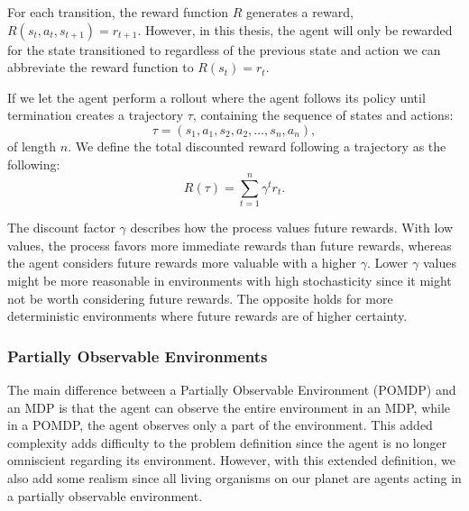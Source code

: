 \documentclass[12pt,A4]{report}
\theoremstyle{definition}
\begin{document}
For each transition, the reward function $R$  generates a reward, $R(s_t, a_t, s_{t+1}) = r_{t+1}$. However, in this thesis, the agent will only be rewarded for the state transitioned to regardless of the previous state and action we can abbreviate the reward function to $R(s_t) = r_t$.


If we let the agent perform a rollout where the agent follows its policy until termination creates a trajectory $\tau$, containing the sequence of states and actions:
\[ \tau = (s_1, a_1, s_2, a_2, \dots , s_n, a_n),\]
of length $n$. We define the total discounted reward following a trajectory as the following:
\[ R(\tau) = \sum_{t=1}^n \gamma^t r_t.\]

The discount factor $\gamma$ describes how the process values future rewards. With low values, the process favors more immediate rewards than future rewards, whereas the agent considers future rewards more valuable with a higher $\gamma$. Lower $\gamma$ values might be more reasonable in environments with high stochasticity since it might not be worth considering future rewards. The opposite holds for more deterministic environments where future rewards are of higher certainty.


\subsubsection{Partially Observable Environments}

The main difference between a Partially Observable Environment (POMDP) and an MDP is that the agent can observe the entire environment in an MDP, while in a POMDP, the agent observes only a part of the environment. This added complexity adds difficulty to the problem definition since the agent is no longer omniscient regarding its environment. However, with this extended definition, we also add some realism since all living organisms on our planet are agents acting in a partially observable environment.
\end{document}
